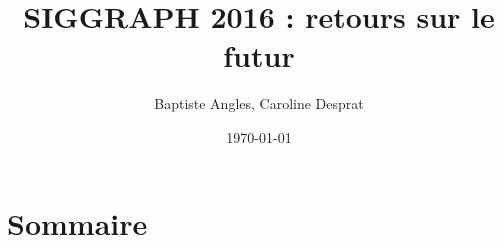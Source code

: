 \documentclass{beamer}
\title{SIGGRAPH 2016 : retours sur le futur}
\author{Baptiste Angles, Caroline Desprat}
\date{\today}
\begin{document}
\frame{\titlepage}

\section[Outline]{Sommaire}
\frame{\tableofcontents}




\end{document}
